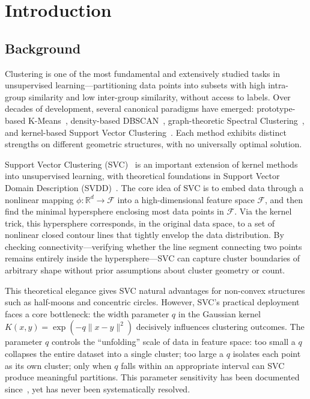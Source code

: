 \section{Introduction}

\subsection{Background}

Clustering is one of the most fundamental and extensively studied tasks in unsupervised learning---partitioning data points into subsets with high intra-group similarity and low inter-group similarity, without access to labels. Over decades of development, several canonical paradigms have emerged: prototype-based K-Means~\cite{macqueen1967}, density-based DBSCAN~\cite{ester1996}, graph-theoretic Spectral Clustering~\cite{ng2002}, and kernel-based Support Vector Clustering~\cite{benhur2001}. Each method exhibits distinct strengths on different geometric structures, with no universally optimal solution.

Support Vector Clustering (SVC)~\cite{benhur2001,benhur2000} is an important extension of kernel methods into unsupervised learning, with theoretical foundations in Support Vector Domain Description (SVDD)~\cite{tax1999,tax2004}. The core idea of SVC is to embed data through a nonlinear mapping $\phi: \mathbb{R}^d \rightarrow \mathcal{F}$ into a high-dimensional feature space $\mathcal{F}$, and then find the minimal hypersphere enclosing most data points in $\mathcal{F}$. Via the kernel trick, this hypersphere corresponds, in the original data space, to a set of nonlinear closed contour lines that tightly envelop the data distribution. By checking connectivity---verifying whether the line segment connecting two points remains entirely inside the hypersphere---SVC can capture cluster boundaries of arbitrary shape without prior assumptions about cluster geometry or count.

This theoretical elegance gives SVC natural advantages for non-convex structures such as half-moons and concentric circles. However, SVC's practical deployment faces a core bottleneck: the width parameter $q$ in the Gaussian kernel $K(x,y)=\exp(-q\|x-y\|^2)$ decisively influences clustering outcomes. The parameter $q$ controls the ``unfolding'' scale of data in feature space: too small a $q$ collapses the entire dataset into a single cluster; too large a $q$ isolates each point as its own cluster; only when $q$ falls within an appropriate interval can SVC produce meaningful partitions. This parameter sensitivity has been documented since~\cite{benhur2001}, yet has never been systematically resolved.

